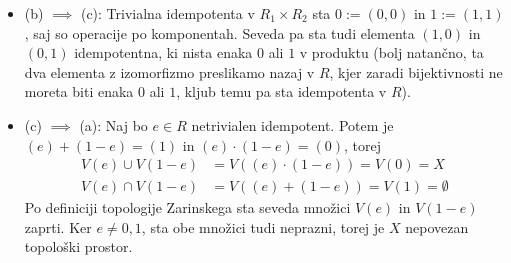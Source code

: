 \documentclass[a4paper, 12pt]{article}
\begin{document}
\begin{itemize}
	\item (b) $\implies$ (c): Trivialna idempotenta v $R_1 \times R_2$ sta $0 := (0, 0)$ in $1 := (1, 1)$, saj so operacije po komponentah. Seveda pa sta tudi elementa $(1, 0)$ in $(0, 1)$ idempotentna, ki nista enaka $0$ ali $1$ v produktu (bolj natančno, ta dva elementa z izomorfizmo preslikamo nazaj v $R$, kjer zaradi bijektivnosti ne moreta biti enaka $0$ ali $1$, kljub temu pa sta idempotenta v $R$).
	
	\item (c) $\implies$ (a): Naj bo $e \in R$ netrivialen idempotent. Potem je $(e) + (1-e) = (1)$ in $(e)\cdot(1-e) = (0)$, torej
	\begin{align*}
	V(e) \cup V(1-e) &= V((e)\cdot(1-e)) = V(0) = X \\
	V(e) \cap V(1-e) &= V((e) + (1-e)) = V(1) = \emptyset
	\end{align*}
	Po definiciji topologije Zarinskega sta seveda množici $V(e)$ in $V(1-e)$ zaprti. Ker $e \neq 0, 1$, sta obe množici tudi neprazni, torej je $X$ nepovezan topološki prostor.
\end{itemize}
\end{document}

